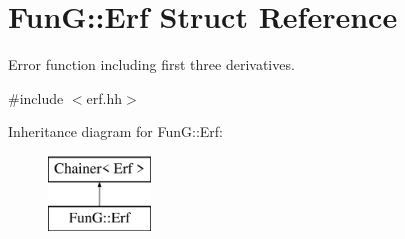 \hypertarget{structFunG_1_1Erf}{}\section{FunG\+:\+:Erf Struct Reference}
\label{structFunG_1_1Erf}


Error function including first three derivatives.  




{\ttfamily \#include $<$erf.\+hh$>$}

Inheritance diagram for FunG\+:\+:Erf\+:\begin{figure}[H]
\begin{center}
\leavevmode
\includegraphics[height=2.000000cm]{structFunG_1_1Erf}
\end{center}
\end{figure}
